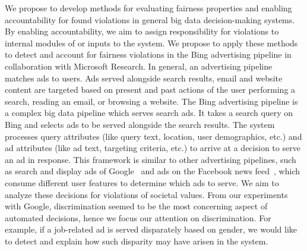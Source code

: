 \documentclass[10pt, onecolumn]{report}
\begin{document}
We propose to develop methods for evaluating fairness properties and enabling 
accountability for found violations in general big data decision-making systems. 
By enabling accountability, we aim to assign responsibility for
violations to internal modules of or inputs to the system. 
We propose to apply these methods to detect and account for
fairness violations in the Bing advertising pipeline in collaboration with Microsoft Research.
In general, an advertising pipeline matches ads to users. 
Ads served alongside search results, email and website content are targeted based on
present and past actions of the user performing a search, reading an email, or browsing
a website. The Bing advertising pipeline is a complex big data pipeline 
which serves search ads. It takes a search query on Bing
and selects ads to be served alongside the search results. The system processes
query attributes (like query text, location, user demographics, etc.) and 
ad attributes (like ad text, targeting criteria, etc.) to arrive at a decision to 
serve an ad in response. 
This framework is similar to other advertising pipelines, such as search and 
display ads of Google~\cite{google-search, google-display} 
and ads on the Facebook news feed~\cite{facebook-ads}, which consume different
user features to determine which ads to serve. 
We aim to analyze these decisions for violations of societal values. 
From our experiments with Google, discrimination seemed to be the most concerning 
aspect of automated decisions, hence we focus our attention on discrimination. 
For example, if a job-related ad is served disparately based on gender,  
we would like to detect and explain how such disparity may have arisen in the system. 
\end{document}
